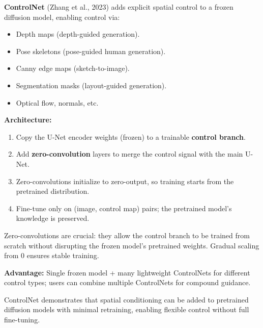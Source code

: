 \begin{paperbox}[title={ControlNet: Spatial Conditioning}]
\textbf{ControlNet} (Zhang et al., 2023) adds explicit spatial control to a frozen diffusion model, enabling control via:
\begin{itemize}
  \item Depth maps (depth-guided generation).
  \item Pose skeletons (pose-guided human generation).
  \item Canny edge maps (sketch-to-image).
  \item Segmentation masks (layout-guided generation).
  \item Optical flow, normals, etc.
\end{itemize}

\textbf{Architecture:}
\begin{enumerate}
  \item Copy the U-Net encoder weights (frozen) to a trainable \textbf{control branch}.
  \item Add \textbf{zero-convolution} layers to merge the control signal with the main U-Net.
  \item Zero-convolutions initialize to zero-output, so training starts from the pretrained distribution.
  \item Fine-tune only on (image, control map) pairs; the pretrained model's knowledge is preserved.
\end{enumerate}

\begin{intuitionbox}
Zero-convolutions are crucial: they allow the control branch to be trained from scratch without disrupting the frozen model's pretrained weights. Gradual scaling from 0 ensures stable training.
\end{intuitionbox}

\textbf{Advantage:} Single frozen model + many lightweight ControlNets for different control types; users can combine multiple ControlNets for compound guidance.

\begin{notebox}
ControlNet demonstrates that spatial conditioning can be added to pretrained diffusion models with minimal retraining, enabling flexible control without full fine-tuning.
\end{notebox}
\end{paperbox}

